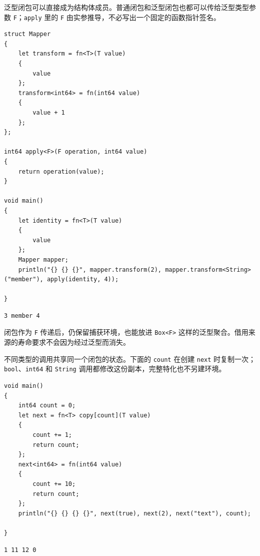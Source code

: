 泛型闭包可以直接成为结构体成员。普通闭包和泛型闭包也都可以传给泛型类型参数 \texttt{F}；\texttt{apply} 里的 \texttt{F} 由实参推导，不必写出一个固定的函数指针签名。

\par
\medskip
\begin{lstlisting}[style=chali]
struct Mapper
{
    let transform = fn<T>(T value)
    {
        value
    };
    transform<int64> = fn(int64 value)
    {
        value + 1
    };
};

int64 apply<F>(F operation, int64 value)
{
    return operation(value);
}

void main()
{
    let identity = fn<T>(T value)
    {
        value
    };
    Mapper mapper;
    println("{} {} {}", mapper.transform(2), mapper.transform<String>("member"), apply(identity, 4));

}
\end{lstlisting}
\par
\medskip

\par
\medskip
\begin{lstlisting}[style=out]
3 member 4
\end{lstlisting}
\par
\medskip

闭包作为 \texttt{F} 传递后，仍保留捕获环境，也能放进 \texttt{Box<\allowbreak{}F>\allowbreak{}} 这样的泛型聚合。借用来源的寿命要求不会因为经过泛型而消失。

不同类型的调用共享同一个闭包的状态。下面的 \texttt{count} 在创建 \texttt{next} 时复制一次；\texttt{bool}、\texttt{int64} 和 \texttt{String} 调用都修改这份副本，完整特化也不另建环境。

\par
\medskip
\begin{lstlisting}[style=chali]
void main()
{
    int64 count = 0;
    let next = fn<T> copy[count](T value)
    {
        count += 1;
        return count;
    };
    next<int64> = fn(int64 value)
    {
        count += 10;
        return count;
    };
    println("{} {} {} {}", next(true), next(2), next("text"), count);

}
\end{lstlisting}
\par
\medskip

\par
\medskip
\begin{lstlisting}[style=out]
1 11 12 0
\end{lstlisting}
\par
\medskip

